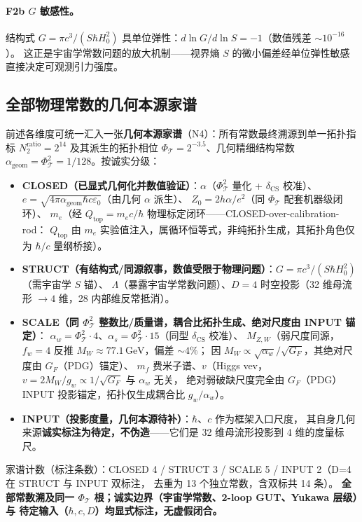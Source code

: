 \documentclass[11pt,a4paper]{article}
\begin{document}
\paragraph{F2b $G$ 敏感性。}
结构式 $G=\pi c^3/(S\hbar H_0^2)$ 具单位弹性：$d\ln G/d\ln S=-1$（数值残差 $\sim 10^{-16}$）。
这正是宇宙学常数问题的放大机制——视界熵 $S$ 的微小偏差经单位弹性敏感直接决定可观测引力强度。

\subsection{全部物理常数的几何本源家谱}
前述各维度可统一汇入一张\textbf{几何本源家谱}（N4）：所有常数最终溯源到单一拓扑指标
$N_2^{\mathrm{ratio}}=2^{14}$ 及其派生的拓扑相位 $\Phi_{\mathcal T}=2^{-3.5}$、几何精细结构常数
$\alpha_{\mathrm{geom}}=\Phi_{\mathcal T}^2=1/128$。按诚实分级：

\begin{itemize}
  \item \textbf{CLOSED（已显式几何化并数值验证）}：$\alpha$（$\Phi_{\mathcal T}^2$ 量化 + $\delta_{\mathrm{CS}}$ 校准）、
    $e=\sqrt{4\pi\alpha_{\mathrm{geom}}\hbar c\varepsilon_0}$（由几何 $\alpha$ 派生）、
    $Z_0=2h\alpha/e^2$（同 $\Phi_{\mathcal T}$ 配套机器级闭环）、
    $m_e$（经 $Q_{\mathrm{top}}=m_e c/\hbar$ 物理标定闭环——CLOSED-over-calibration-rod：
    $Q_{\mathrm{top}}$ 由 $m_e$ 实验值注入，属循环恒等式，非纯拓扑生成，其拓扑角色仅为 $\hbar/c$ 量纲桥接）。
  \item \textbf{STRUCT（有结构式/同源叙事，数值受限于物理问题）}：$G=\pi c^3/(S\hbar H_0^2)$（需宇宙学 $S$ 锚）、
    $\Lambda$（暴露宇宙学常数问题）、$D=4$ 时空投影（32 维母流形 $\to4$ 维，28 内部维反常抵消）。
  \item \textbf{SCALE（同 $\Phi_{\mathcal T}^2$ 整数比/质量谱，耦合比拓扑生成、绝对尺度由 INPUT 锚定）}：
    $\alpha_w=\Phi_{\mathcal T}^2\cdot4$、$\alpha_s=\Phi_{\mathcal T}^2\cdot15$（同型 $\delta_{\mathrm{CS}}$ 校准）、
    $M_{Z,W}$（弱尺度同源，$f_w=4$ 反推 $M_W\approx77.1\,\mathrm{GeV}$，偏差 $\sim4\%$；
    因 $M_W\propto\sqrt{\alpha_w}/\sqrt{G_F}$，其绝对尺度由 $G_F$（PDG）锚定）、
    $m_f$ 费米子谱、$v$（Higgs vev，$v=2M_W/g_w\propto1/\sqrt{G_F}$ 与 $\alpha_w$ 无关，
    绝对弱破缺尺度完全由 $G_F$（PDG）INPUT 投影锚定，拓扑仅生成耦合比 $g_w/\alpha_w$）。
  \item \textbf{INPUT（投影度量，几何本源待补）}：$\hbar$、$c$ 作为框架入口尺度，
    其自身几何来源\textbf{诚实标注为待定，不伪造}——它们是 32 维母流形投影到 4 维的度量标尺。
\end{itemize}
家谱计数（标注条数）：CLOSED 4 / STRUCT 3 / SCALE 5 / INPUT 2（D=4 在 STRUCT 与 INPUT 双标注，
去重为 13 个独立常数，含双标共 14 条）。
\textbf{全部常数溯及同一 $\Phi_{\mathcal T}$ 根；诚实边界（宇宙学常数、2-loop GUT、Yukawa 层级）与
待定输入（$\hbar,c,D$）均显式标注，无虚假闭合。}
\end{document}
